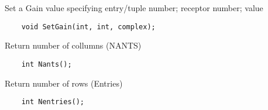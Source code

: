        Set a Gain value specifying
         entry/tuple number;
         receptor number;
         value
\begin{verbatim}
    void SetGain(int, int, complex);
\end{verbatim}

       Return number of collumns (NANTS)
\begin{verbatim}
    int Nants();
\end{verbatim}

       Return number of rows (Entries)
\begin{verbatim}
    int Nentries();
\end{verbatim}

